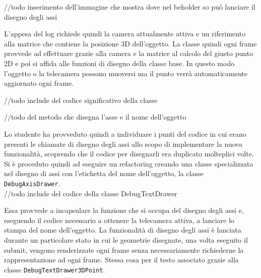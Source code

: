 //todo inserimento dell'immagine che mostra dove nel beholder so può lanciare il disegno degli assi

L'appesa del log richiede quindi la camera attualmente attiva e un riferimento alla matrice che contiene la posizione 3D dell'oggetto. La classe quindi ogni frame provvede ad effettuare grazie alla camera e la matrice al calcolo del giusto punto 2D e poi si affida alle funzioni di disegno della classe base. In questo modo l'oggetto o la telecamera possono muoversi ma il punto verrà automaticamente aggiornato ogni frame.

//todo include del codice significativo della classe

//todo del metodo che disegna l'asse e il nome dell'oggetto

Lo studente ha provveduto quindi a individuare i punti del codice in cui erano presenti le chiamate di disegno degli assi allo scopo di implementare la nuova funzionalità, scoprendo che il codice per disegnarli era duplicato molteplici volte.\\

Si è proceduto quindi ad eseguire un refactoring creando una classe specializzata nel disegno di assi con l'etichetta del nome dell'oggetto, la classe \texttt{DebugAxisDrawer}.\\

//todo include del codice della classe DebugTextDrawer

Essa provvede a incapsulare la funzione che si occupa del disegno degli assi e, eseguendo il codice necessario a ottenere la telecamera attiva, a lanciare lo stampa del nome dell'oggetto. La funzionalità di disegno degli assi è lanciata durante un particolare stato in cui le geometrie disegnate, una volta eseguito il submit, vengono renderizzate ogni frame senza necessariamente richiederne la rappresentazione ad ogni frame. Stessa cosa per il testo associato grazie alla classe \texttt{DebugTextDrawer3DPoint}.
